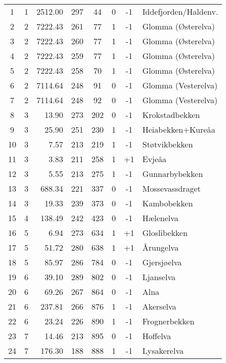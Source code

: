 \begin{center}
 \begin{supertabular}{ccrccccl}
  1	& 1	& 2512.00	& 297		& 44		& 0		& -1	& Iddefjorden/Haldenv.		\\
  2	& 2	& 7222.43	& 261		& 77		& 1		& -1	& Glomma ({\O}sterelva)		\\
  3	& 2	& 7222.43	& 260		& 77		& 1		& -1	& Glomma ({\O}sterelva)		\\
  4	& 2	& 7222.43	& 259		& 77		& 1		& -1	& Glomma ({\O}sterelva)		\\
  5	& 2	& 7222.43	& 258		& 70		& 1		& -1	& Glomma ({\O}sterelva)		\\
  6	& 2	& 7114.64	& 248		& 91		& 0		& -1	& Glomma (Vesterelva)		\\
  7	& 2	& 7114.64	& 248		& 92		& 0		& -1	& Glomma (Vesterelva)		\\
  8	& 3	& 13.90		& 273		& 202		& 0		& -1	& Krokstadbekken		\\
  9	& 3	& 25.90		& 251		& 230		& 1		& -1	& Heiabekken+Kure{\aa}a		\\
  10	& 3	& 7.57		& 213		& 219		& 1		& -1	& St{\o}tvikbekken		\\
  11	& 3	& 3.83		& 211		& 258		& 1		& +1	& Evje{\aa}a			\\
  12	& 3	& 5.55		& 213		& 275		& 1		& -1	& Gunnarbybekken		\\
  13	& 3	& 688.34	& 221		& 337		& 0		& -1	& Mossevassdraget		\\
  14	& 3	& 19.33		& 239		& 373		& 0		& -1	& Kambobekken			\\
  15	& 4	& 138.49	& 242		& 423		& 0		& -1	& H{\ae}lenelva			\\
  16	& 5	& 6.94		& 273		& 634		& 1		& +1	& Gloslibekken			\\
  17	& 5	& 51.72		& 280		& 638		& 1		& +1	& {\AA}rungelva			\\
  18	& 5	& 85.97		& 286		& 784		& 0		& -1	& Gjersj{\o}elva		\\
  19	& 6	& 39.10		& 289		& 802		& 0		& -1	& Ljanselva			\\
  20	& 6	& 69.26		& 267		& 864		& 0		& -1	& Alna				\\
  21	& 6	& 237.81	& 266		& 876		& 1		& -1	& Akerselva                	\\
  22	& 6	& 23.24		& 226		& 890		& 1		& -1	& Frognerbekken            	\\
  23	& 7	& 14.46		& 213		& 895		& 0		& -1	& Hoffelva               	\\
  24	& 7	& 176.30	& 188		& 888		& 1		& -1	& Lysakerelva                	\\

\end{supertabular}
\end{center}
